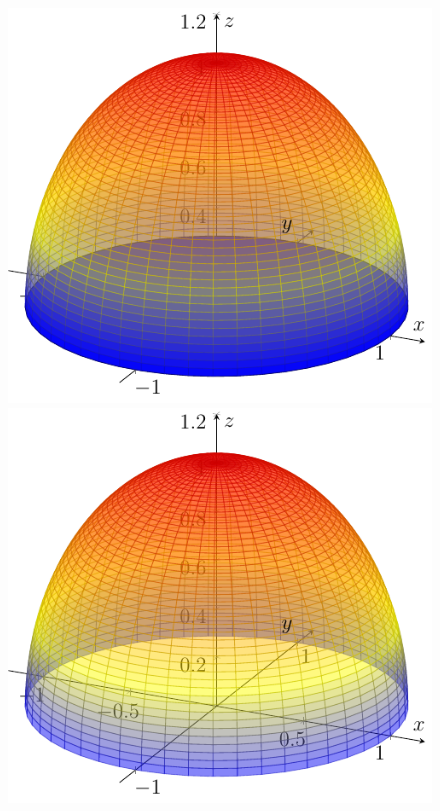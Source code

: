 \begin{frame}
    \begin{figure}[ht]
        \begin{minipage}[b]{0.30\linewidth}
            \centering
            \includegraphics[width=\textwidth]{../img/3-Lukket.pdf}
        \end{minipage}
        \hspace{0.30cm}
        \begin{minipage}[b]{0.30\linewidth}
            \centering
            \includegraphics[width=\textwidth]{../img/1-Topp.pdf}

\end{minipage}
\end{figure}
\end{frame}
